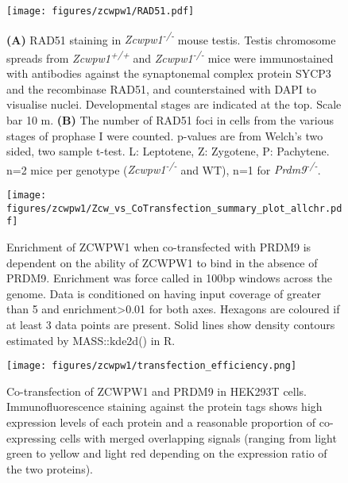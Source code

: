 \begin{figure}[H]
	\centering
	\texttt{[image: figures/zcwpw1/RAD51.pdf]}
	\caption[RAD51 Counts]{
		\textbf{(A)} RAD51 staining in \textit{Zcwpw1\textsuperscript{-/-}} mouse testis.
			Testis chromosome spreads from \textit{Zcwpw1\textsuperscript{+/+}} and \textit{Zcwpw1\textsuperscript{-/-}} mice were immunostained with antibodies against the synaptonemal complex protein SYCP3 and the recombinase RAD51, and counterstained with DAPI to visualise nuclei.
			Developmental stages are indicated at the top.
			Scale bar 10 \textmu m.
		\textbf{(B)} The number of RAD51 foci in cells from the various stages of prophase I were counted.
			p-values are from Welch’s two sided, two sample t-test.
			L: Leptotene, Z: Zygotene, P: Pachytene.
			n=2 mice per genotype (\textit{Zcwpw1\textsuperscript{-/-}} and WT), n=1 for \textit{Prdm9\textsuperscript{-/-}}.
	}
	\label{fig:Rad51}
\end{figure}


\begin{figure}[H]
	\centering
	\texttt{[image: figures/zcwpw1/Zcw\_vs\_CoTransfection\_summary\_plot\_allchr.pdf]}
	\caption[Zcwpw1 alone vs Co-transfection]{
		Enrichment of ZCWPW1 when co-transfected with PRDM9 is dependent on the ability of ZCWPW1 to bind in the absence of PRDM9.
		Enrichment was force called in 100bp windows across the genome.
		Data is conditioned on having input coverage of greater than 5 and enrichment>0.01 for both axes.
		Hexagons are coloured if at least 3 data points are present.
		Solid lines show density contours estimated by MASS::kde2d() in R.
	}
	\label{fig:Zcw_vs_cotransfection}
\end{figure}


\begin{figure}[H]
	\centering
	\texttt{[image: figures/zcwpw1/transfection\_efficiency.png]}
	\caption[Transfection Efficiency]{
		Co-transfection of ZCWPW1 and PRDM9 in HEK293T cells.
		Immunofluorescence staining against the protein tags shows high expression levels of each protein and a reasonable proportion of co-expressing cells with merged overlapping signals (ranging from light green to yellow and light red depending on the expression ratio of the two proteins).
	}
	\label{fig:transfection_efficiency}
\end{figure}


